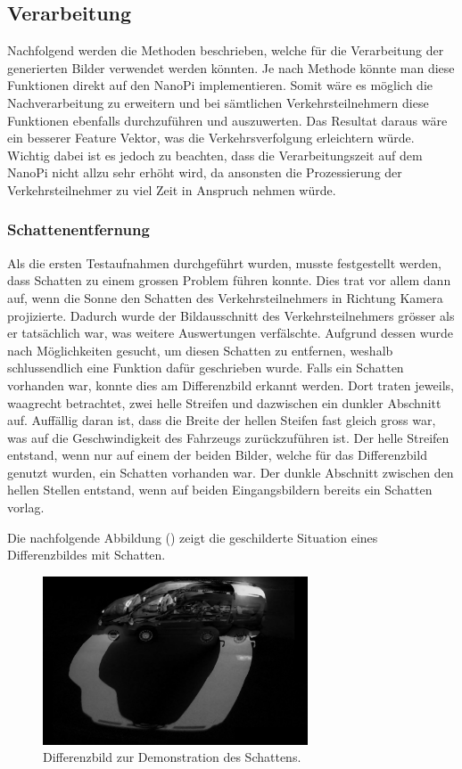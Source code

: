 \subsection{Verarbeitung}
Nachfolgend werden die Methoden beschrieben, welche für die Verarbeitung der generierten Bilder verwendet werden könnten. Je nach Methode könnte man diese Funktionen direkt auf den NanoPi implementieren. Somit wäre es möglich die Nachverarbeitung zu erweitern und bei sämtlichen Verkehrsteilnehmern diese Funktionen ebenfalls durchzuführen und auszuwerten. Das Resultat daraus wäre ein besserer Feature Vektor, was die Verkehrsverfolgung erleichtern würde. Wichtig dabei ist es jedoch zu beachten, dass die Verarbeitungszeit auf dem NanoPi nicht allzu sehr erhöht wird, da ansonsten die Prozessierung der Verkehrsteilnehmer zu viel Zeit in Anspruch nehmen würde.

\subsubsection{Schattenentfernung}
Als die ersten Testaufnahmen durchgeführt wurden, musste festgestellt werden, dass Schatten zu einem grossen Problem führen konnte. Dies trat vor allem dann auf, wenn die Sonne den Schatten des Verkehrsteilnehmers in Richtung Kamera projizierte. Dadurch wurde der Bildausschnitt des Verkehrsteilnehmers grösser als er tatsächlich war, was weitere Auswertungen verfälschte. Aufgrund dessen wurde nach Möglichkeiten gesucht, um diesen Schatten zu entfernen, weshalb schlussendlich eine Funktion dafür geschrieben wurde.
Falls ein Schatten vorhanden war, konnte dies am Differenzbild erkannt werden. Dort traten jeweils, waagrecht betrachtet, zwei helle Streifen und dazwischen ein dunkler Abschnitt auf. Auffällig daran ist, dass die Breite der hellen Steifen fast gleich gross war, was auf die Geschwindigkeit des Fahrzeugs zurückzuführen ist. Der helle Streifen entstand, wenn nur auf einem der beiden Bilder, welche für das Differenzbild genutzt wurden, ein Schatten vorhanden war. Der dunkle Abschnitt zwischen den hellen Stellen entstand, wenn auf beiden Eingangsbildern bereits ein Schatten vorlag.

\newpage
Die nachfolgende Abbildung () zeigt die geschilderte Situation eines Differenzbildes mit Schatten.

\begin{figure}[H]
  \centering
  \includegraphics[width=0.7\textwidth]{Testversuche/BlurRemoveShadow.jpg} 
  \caption{Differenzbild zur Demonstration des Schattens.}
  \label{bBlurRemoveShadow}
\end{figure} 

